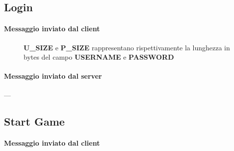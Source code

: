 \newpage

\subsection{Login}

\paragraph{Messaggio inviato dal client}

\begin{lrbox}{\asciiart}
	\begin{varwidth}{\maxdimen}
		\noindent
	\end{varwidth}
\end{lrbox}%

\begin{center}
	\begin{figure}[h]
		\makebox[\textwidth]{\showasciiart{80.5ex}}
		\centering \textbf{U\_SIZE} e \textbf{P\_SIZE} rappresentano rispettivamente la lunghezza in bytes del campo \textbf{USERNAME} e \textbf{PASSWORD}
	\end{figure}
\end{center}

\paragraph{Messaggio inviato dal server}

---

\subsection{Start Game}

\paragraph{Messaggio inviato dal client}

\begin{lrbox}{\asciiart}
	\begin{varwidth}{\maxdimen}
		\noindent
	\end{varwidth}
\end{lrbox}%

\begin{center}
	\begin{figure}[h]
		\makebox[\textwidth]{\showasciiart{40ex}}
	\end{figure}
\end{center}

